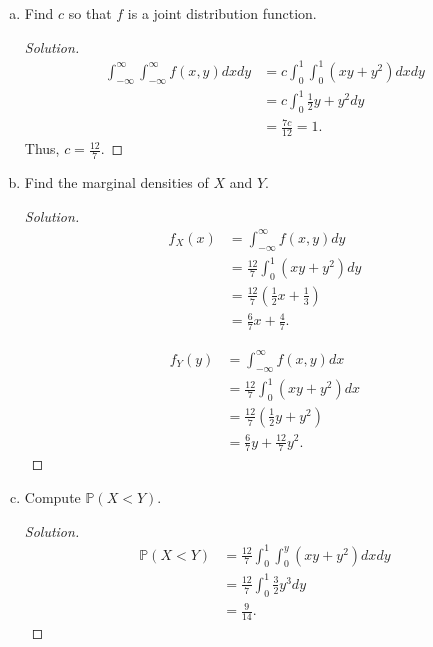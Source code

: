 \documentclass[addpoints, 11pt]{exam}
\newcommand*{\prob}{\mathds{P}}
\begin{document}
\begin{enumerate}[(a)]
    \color{crimson}
    \item  Find $c$ so that $f$ is a joint distribution function.
    \normalcolor
    
    \begin{proof}[Solution]
        \begin{align*}
            \int^{\infty}_{-\infty}\int^{\infty}_{-\infty} f(x, y) dxdy
            &= c\int^{1}_{0}\int^{1}_{0} (xy + y^2) dxdy \\
            &= c\int^1_0 \frac{1}{2}y + y^2 dy \\
            &= \frac{7c}{12} = 1.
        \end{align*}
        Thus, $c = \frac{12}{7}$.
    \end{proof}

    \color{crimson}
    \item   Find the marginal densities of $X$ and $Y$.
    \normalcolor
    
    \begin{proof}[Solution]
        \begin{align*}
            f_X(x) 
            &= \int^{\infty}_{-\infty} f(x, y) dy \\
            &= \frac{12}{7}\int^1_0 (xy + y^2) dy \\
            &= \frac{12}{7}\left(\frac{1}{2}x +  \frac{1}{3}\right) \\
            &= \frac{6}{7}x + \frac{4}{7}.
        \end{align*}

        \begin{align*}
            f_Y(y) 
            &= \int^{\infty}_{-\infty} f(x, y) dx \\
            &= \frac{12}{7}\int^1_0 (xy + y^2) dx \\
            &= \frac{12}{7}\left(\frac{1}{2}y +  y^2\right) \\
            &= \frac{6}{7}y + \frac{12}{7}y^2.
        \end{align*}
    \end{proof}

    \color{crimson}
    \item   Compute $\prob(X < Y)$.
    \normalcolor
    
    \begin{proof}[Solution]
        \begin{align*}
            \prob(X < Y)
            &= \frac{12}{7}\int^1_0 \int^y_0 (xy + y^2) dxdy \\
            &= \frac{12}{7} \int^1_0 \frac{3}{2}y^3 dy \\
            &= \frac{9}{14}.
        \end{align*}
    \end{proof}


\end{enumerate}
\end{document}
